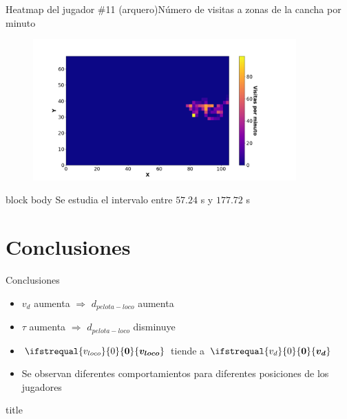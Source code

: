\documentclass{beamer}
\renewcommand\vec[1]{\ifstrequal{#1}{0}{\ensuremath{\mathbf{0}}}{\ensuremath{\boldsymbol{#1}}}}
\begin{document}
            \begin{frame}{Heatmap del jugador \#11 (arquero)}{Número de visitas a zonas de la cancha por minuto}
                \begin{figure}[H!]
                    \includegraphics[width=0.9\textwidth]{./heatmap_jugador_11}
                    \label{fig:futbol_15}
                \end{figure}
                \begin{beamercolorbox}[sep=5pt,center]{block body}
                    \centering
                    \small{Se estudia el intervalo entre $57.24$ s y $177.72$ s}
                \end{beamercolorbox}
            \end{frame}

    \section{Conclusiones}

        \begin{frame}{Conclusiones}
            \begin{itemize}
                \item $v_d$ aumenta $\Rightarrow$ $d_{pelota-loco}$ aumenta
                \item $\tau$ aumenta $\Rightarrow$ $d_{pelota-loco}$ disminuye
                \item $\vec{v_{loco}}$ tiende a $\vec{v_d}$
                \item Se observan diferentes comportamientos para diferentes posiciones de los jugadores
            \end{itemize}
        \end{frame}

        \begin{frame}
            \begin{beamercolorbox}[sep=8pt,center]{title}
            \end{beamercolorbox}
        \end{frame}
\end{document}
